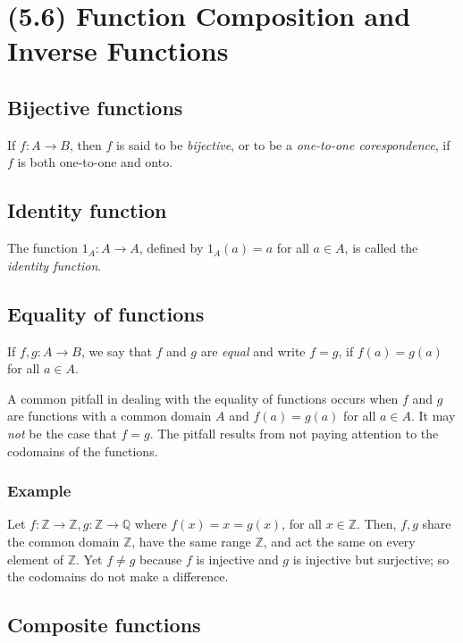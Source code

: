 \documentclass[11pt]{article}
\begin{document}
    \pagebreak
    \section{(5.6) Function Composition and Inverse Functions}

    \subsection{Bijective functions}

    If \(f: A \rightarrow B\), then $f$ is said to be \emph{bijective}, or to be a \emph{one-to-one corespondence}, if $f$ is both one-to-one and onto.

    \subsection{Identity function}

    The function \(1_A : A \rightarrow A\), defined by \(1_A (a) = a\) for all \(a \in A\), is called the \emph{identity function}.

    \subsection{Equality of functions}

    If \(f,g : A \rightarrow B\), we say that $f$ and $g$ are \emph{equal} and write \(f = g\), if \(f(a) = g(a)\) for all \(a \in A\).

    A common pitfall in dealing with the equality of functions occurs when $f$ and $g$ are functions with a common domain $A$ and \(f(a) = g(a)\) for all \(a \in A\). It may \emph{not} be the case that \(f = g\). The pitfall results from not paying attention to the codomains of the functions.

    \subsubsection{Example}

    Let \(f: \mathbb{Z} \rightarrow \mathbb{Z}, g: \mathbb{Z} \rightarrow \mathbb{Q}\) where \(f(x) = x = g(x)\), for all \(x \in \mathbb{Z}\). Then, \(f,g \) share the common domain \(\mathbb{Z}\), have the same range \(\mathbb{Z}\), and act the same on every element of \(\mathbb{Z}\). Yet \(f \neq g\) because $f$ is injective and $g$ is injective but surjective; so the codomains do not make a difference.

    \subsection{Composite functions}
\end{document}
